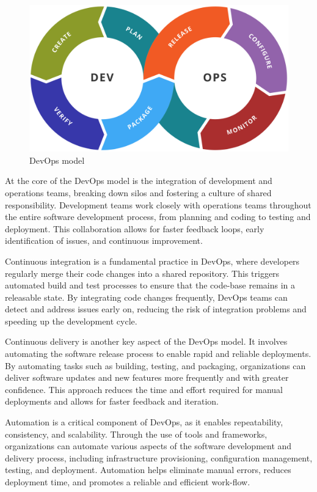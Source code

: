 \documentclass[
12pt,
oneside, 
onehalfspacing, 
nolistspacing, 
parskip, 
chapterinoneline, 
]{AASTCOMPUTER}
\begin{document}
\begin{figure}[!ht]
	\centering
	\includegraphics[scale=0.3]{Figures/DevOps/DevOps.png}
  	\caption{DevOps model}
  	\label{fig:DevOps model}
\end{figure}

At the core of the DevOps model is the integration of development and operations teams, breaking down silos and fostering a culture of shared responsibility. Development teams work closely with operations teams throughout the entire software development process, from planning and coding to testing and deployment. This collaboration allows for faster feedback loops, early identification of issues, and continuous improvement.

Continuous integration is a fundamental practice in DevOps, where developers regularly merge their code changes into a shared repository. This triggers automated build and test processes to ensure that the code-base remains in a releasable state. By integrating code changes frequently, DevOps teams can detect and address issues early on, reducing the risk of integration problems and speeding up the development cycle.

Continuous delivery is another key aspect of the DevOps model. It involves automating the software release process to enable rapid and reliable deployments. By automating tasks such as building, testing, and packaging, organizations can deliver software updates and new features more frequently and with greater confidence. This approach reduces the time and effort required for manual deployments and allows for faster feedback and iteration.

Automation is a critical component of DevOps, as it enables repeatability, consistency, and scalability. Through the use of tools and frameworks, organizations can automate various aspects of the software development and delivery process, including infrastructure provisioning, configuration management, testing, and deployment. Automation helps eliminate manual errors, reduces deployment time, and promotes a reliable and efficient work-flow.
\end{document}
